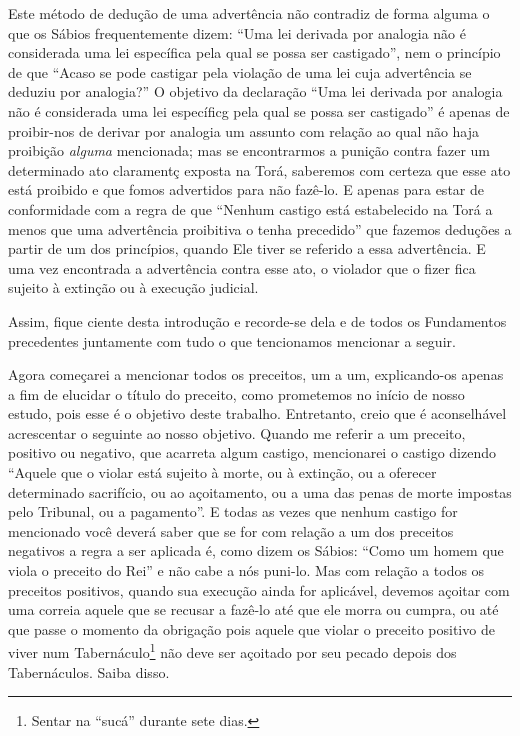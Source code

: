 Este método de dedução de uma advertência não contradiz de forma alguma
o que os Sábios frequentemente dizem: ``Uma lei derivada por analogia
não é considerada uma lei específica pela qual se possa ser castigado'',
nem o princípio de que ``Acaso se pode castigar pela violação de uma lei
cuja advertência se deduziu por analogia?'' O objetivo da declaração
``Uma lei derivada por analogia não é considerada uma lei específicg
pela qual se possa ser castigado'' é apenas de proibir-nos de derivar
por analogia um assunto com relação ao qual não haja proibição
\emph{alguma} mencionada; mas se encontrarmos a punição contra fazer um
determinado ato claramentç exposta na Torá, saberemos com certeza que
esse ato está proibido e que fomos advertidos para não fazê-lo. E apenas
para estar de conformidade com a regra de que ``Nenhum castigo está
estabelecido na Torá a menos que uma advertência proibitiva o tenha
precedido'' que fazemos deduções a partir de um dos princípios, quando
Ele tiver se referido a essa advertência. E uma vez encontrada a
advertência contra esse ato, o violador que o fizer fica sujeito à
extinção ou à execução judicial.

Assim, fique ciente desta introdução e recorde-se dela e de todos os
Fundamentos precedentes juntamente com tudo o que tencionamos mencionar
a seguir.

Agora começarei a mencionar todos os preceitos, um a um, explicando-os
apenas a fim de elucidar o título do preceito, como prometemos no início
de nosso estudo, pois esse é o objetivo deste trabalho. Entretanto,
creio que é aconselhável acrescentar o seguinte ao nosso objetivo.
Quando me referir a um preceito, positivo ou negativo, que acarreta
algum castigo, mencionarei o castigo dizendo ``Aquele que o violar está
sujeito à morte, ou à extinção, ou a oferecer determinado sacrifício, ou
ao açoitamento, ou a uma das penas de morte impostas pelo Tribunal, ou a
pagamento''. E todas as vezes que nenhum castigo for mencionado você
deverá saber que se for com relação a um dos preceitos negativos a regra
a ser aplicada é, como dizem os Sábios: ``Como um homem que viola o
preceito do Rei'' e não cabe a nós puni-lo. Mas com relação a todos os
preceitos positivos, quando sua execução ainda for aplicável, devemos
açoitar com uma correia aquele que se recusar a fazê-lo até que
ele morra ou cumpra, ou até que passe o momento da obrigação pois aquele
que violar o preceito positivo de viver num
Tabernáculo\footnote{Sentar na ``sucá'' durante sete dias.} não deve ser açoitado por seu pecado depois dos Tabernáculos. Saiba disso.


